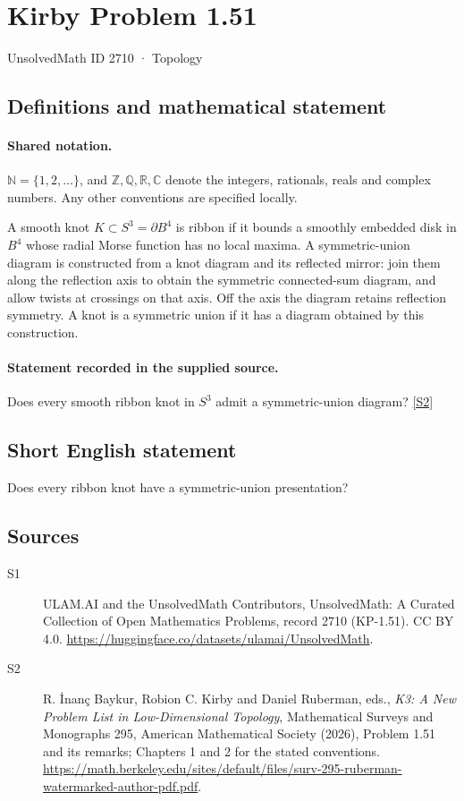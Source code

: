 \documentclass[11pt]{article}
\newcommand{\sref}[2]{\hyperlink{source:#1:#2}{[S#2]}}
\begin{document}
\setcounter{section}{2709}
\section{Kirby Problem 1.51}\label{2710}
{\small\sffamily UnsolvedMath ID 2710 · Topology}
\subsection{Definitions and mathematical statement}

\paragraph{Shared notation.}$\mathbb N=\{1,2,\ldots\}$, and $\mathbb Z,\mathbb Q,\mathbb R,\mathbb C$ denote the integers, rationals, reals and complex numbers. Any other conventions are specified locally.


A smooth knot $K\subset S^3=\partial B^4$ is ribbon if it bounds a smoothly embedded disk in $B^4$ whose radial Morse function has no local maxima. A symmetric-union diagram is constructed from a knot diagram and its reflected mirror: join them along the reflection axis to obtain the symmetric connected-sum diagram, and allow twists at crossings on that axis. Off the axis the diagram retains reflection symmetry. A knot is a symmetric union if it has a diagram obtained by this construction.
\paragraph{Statement recorded in the supplied source.}
Does every smooth ribbon knot in $S^3$ admit a symmetric-union diagram? \sref{2710}{2}

\subsection{Short English statement}
Does every ribbon knot have a symmetric-union presentation?
\subsection{Sources}
\begin{description}
\item[\hypertarget{source:2710:1}{S1}] ULAM.AI and the UnsolvedMath Contributors, UnsolvedMath: A Curated Collection of Open Mathematics Problems, record 2710 (KP-1.51). CC BY 4.0. \url{https://huggingface.co/datasets/ulamai/UnsolvedMath}.
\item[\hypertarget{source:2710:2}{S2}] R. İnanç Baykur, Robion C. Kirby and Daniel Ruberman, eds., \emph{K3: A New Problem List in Low-Dimensional Topology}, Mathematical Surveys and Monographs 295, American Mathematical Society (2026), Problem 1.51 and its remarks; Chapters 1 and 2 for the stated conventions. \url{https://math.berkeley.edu/sites/default/files/surv-295-ruberman-watermarked-author-pdf.pdf}.
\end{description}
\label{end:2710}
\end{document}
